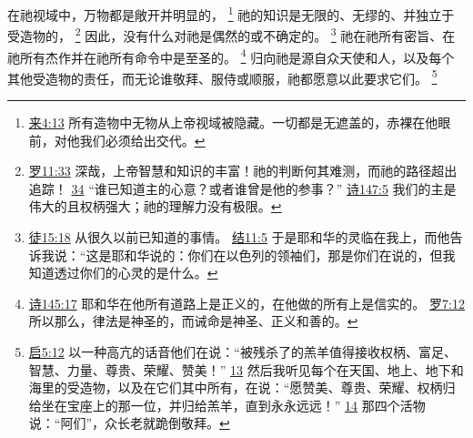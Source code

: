 \documentclass[12pt, a4paper, oneside]{ctexart}
\begin{document}
	在祂视域中，万物都是敞开并明显的，
	\footnote {
		\href{https://biblehub.com/hebrews/4-13.htm}{来4:13} 所有造物中无物从上帝视域被隐藏。一切都是无遮盖的，赤裸在他眼前，对他我们必须给出交代。
	}
	祂的知识是无限的、无缪的、并独立于受造物的，
	\footnote {
		\href{https://biblehub.com/romans/11-33.htm}{罗11:33} 深哉，上帝智慧和知识的丰富！祂的判断何其难测，而祂的路径超出追踪！
		\href{https://biblehub.com/romans/11-34.htm}{34} “谁已知道主的心意？或者谁曾是他的参事？”
		\href{https://biblehub.com/psalms/147-5.htm}{诗147:5} 我们的主是伟大的且权柄强大；祂的理解力没有极限。
	}
	因此，没有什么对祂是偶然的或不确定的。
	\footnote {
		\href{https://biblehub.com/acts/15-18.htm}{徒15:18} 从很久以前已知道的事情。
		\href{https://biblehub.com/ezekiel/11-5.htm}{结11:5} 于是耶和华的灵临在我上，而他告诉我说：“这是耶和华说的：你们在以色列的领袖们，那是你们在说的，但我知道透过你们的心灵的是什么。
	}
	祂在祂所有密旨、在祂所有杰作并在祂所有命令中是至圣的。
	\footnote {
		\href{https://biblehub.com/psalms/145-17.htm}{诗145:17} 耶和华在他所有道路上是正义的，在他做的所有上是信实的。
		\href{https://biblehub.com/romans/7-12.htm}{罗7:12} 所以那么，律法是神圣的，而诫命是神圣、正义和善的。
	}
	归向祂是源自众天使和人，以及每个其他受造物的责任，而无论谁敬拜、服侍或顺服，祂都愿意以此要求它们。
	\footnote {
		\href{https://biblehub.com/revelation/5-12.htm}{启5:12} 以一种高亢的话音他们在说：“被残杀了的羔羊值得接收权柄、富足、智慧、力量、尊贵、荣耀、赞美！”
		\href{https://biblehub.com/revelation/5-13.htm}{13} 然后我听见每个在天国、地上、地下和海里的受造物，以及在它们其中所有，在说：“愿赞美、尊贵、荣耀、权柄归给坐在宝座上的那一位，并归给羔羊，直到永永远远！”
		\href{https://biblehub.com/revelation/5-14.htm}{14} 那四个活物说：“阿们”，众长老就跪倒敬拜。
	}
	
\end{document}
